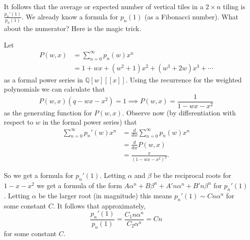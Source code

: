 It follows that the average or expected number of vertical tiles in a $2 \times n$ tiling is $\frac{p_n'(1)}{p_n(1)}$. We already know a formula for $p_n(1)$ (as a Fibonacci number). What about the numerator? Here is the magic trick.

Let 
\begin{align*}
P(w, x) &= \sum_{n = 0}^{\infty}p_n(w)x^n \\
&= 1 + wx + (w^2 + 1)x^2 + (w^3 + 2w)x^3 + \cdots
\end{align*}
as a formal power series in $\mathbb{Q}[w][[x]]$. Using the recurrence for the weighted polynomials we can calculate that
\[P(w, x)(q - wx - x^2) = 1 \implies P(w, x) = \frac{1}{1-wx - x^2}\] as the generating function for $P(w, x)$. Observe now (by differentiation with respect to $w$ in the formal power series) that
\begin{align*}
\sum_{n = 0}^{\infty}p_n'(w)x^n &= \frac{d}{dw}\sum_{n = 0}^{\infty}p_n(w)x^n \\
&= \frac{d}{dw}P(w, x) \\
&= \frac{x}{(1 - wx - x^2)^2}.
\end{align*}

So we get a formula for $p_n'(1)$. Letting $\alpha$ and $\beta$ be the reciprocal roots for $1 - x - x^2$ we get a formula of the form $A\alpha^n + B\beta^n + A'n\alpha^n + B'n\beta^n$ for $p_n'(1)$. Letting $\alpha$ be the larger root (in magnitude) this means $p_n'(1) \sim Cn\alpha^n$ for some constant $C$. It follows that approximately,
\[\frac{p_n'(1)}{p_n(1)} = \frac{C_1n\alpha^n}{C_2\alpha^n} = Cn\] for some constant $C$.